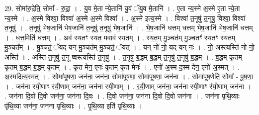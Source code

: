 \documentclass[17pt]{extarticle}
\begin{document}
29. सोमा॑रु॒द्रेति॒ सोमा᳚ - रु॒द्रा॒ । . यु॒व मे॒ता न्ये॒तानि॑ यु॒वं ॅयु॒व मे॒तानि॑ । . ए॒ता न्य॒स्मे अ॒स्मे ए॒ता न्ये॒ता न्य॒स्मे । . अ॒स्मे विश्वा॒ विश्वा॑ अ॒स्मे अ॒स्मे विश्वा᳚ । . अ॒स्मे इत्य॒स्मे । . विश्वा॑ त॒नूषु॑ त॒नूषु॒ विश्वा॒ विश्वा॑ त॒नूषु॑ । . त॒नूषु॑ भेष॒जानि॑ भेष॒जानि॑ त॒नूषु॑ त॒नूषु॑ भेष॒जानि॑ । . भे॒ष॒जानि॑ धत्तम् धत्तम् भेष॒जानि॑ भेष॒जानि॑ धत्तम् । . ध॒त्त॒मिति॑ धत्तम् । . अव॑ स्यतꣳ स्यत॒ मवाव॑ स्यतम् । . स्य॒त॒म् मु॒ञ्चत॑म् मु॒ञ्चतꣳ॑ स्यतꣳ स्यतम् मु॒ञ्चत᳚म् । . मु॒ञ्चतं॒ ॅयद् यन् मु॒ञ्चत॑म् मु॒ञ्चतं॒ ॅयत् । . यन् नो॑ नो॒ यद् यन् नः॑ । . नो॒ अस्त्यस्ति॑ नो नो॒ अस्ति॑ । . अस्ति॑ त॒नूषु॑ त॒नू ष्वस्त्यस्ति॑ त॒नूषु॑ । . त॒नूषु॑ ब॒द्धम् ब॒द्धम् त॒नूषु॑ त॒नूषु॑ ब॒द्धम् । . ब॒द्धम् कृ॒तम् कृ॒तम् ब॒द्धम् ब॒द्धम् कृ॒तम् । . कृ॒त मेन॒ एनः॑ कृ॒तम् कृ॒त मेनः॑ । . एनो॑ अ॒स्म द॒स्म देन॒ एनो॑ अ॒स्मत् । . अ॒स्मदित्य॒स्मत् । . सोमा॑पूषणा॒ जन॑ना॒ जन॑ना॒ सोमा॑पूषणा॒ सोमा॑पूषणा॒ जन॑ना । . सोमा॑पूष॒णेति॒ सोमा᳚ - पू॒ष॒णा॒ । . जन॑ना रयी॒णाꣳ र॑यी॒णाम् जन॑ना॒ जन॑ना रयी॒णाम् । . र॒यी॒णाम् जन॑ना॒ जन॑ना रयी॒णाꣳ र॑यी॒णाम् जन॑ना । . जन॑ना दि॒वो दि॒वो जन॑ना॒ जन॑ना दि॒वः । . दि॒वो जन॑ना॒ जन॑ना दि॒वो दि॒वो जन॑ना । . जन॑ना पृथि॒व्याः पृ॑थि॒व्या जन॑ना॒ जन॑ना पृथि॒व्याः । . पृ॒थि॒व्या इति॑ पृथि॒व्याः । \newline
\end{document}
